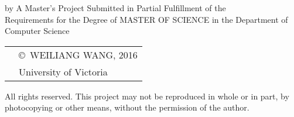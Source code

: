 \pagebreak
{
\centering
\thesistitle
\tpbreak
by
\tpbreak
\nameanddegrees
\tpbreak
A Master's Project Submitted in Partial Fulfillment of the \\
Requirements for the Degree of
\tpbreak
MASTER OF SCIENCE
\tpbreak
in the Department of Computer Science\\
\vfill
\begin{tabular}{cl}
& \copyright\ WEILIANG WANG, 2016\\
& \phantom{\copyright} University of Victoria
\end{tabular}
\tpbreak
All rights reserved. This project may not be reproduced in whole or in part, by \\
\hfill photocopying or other means, without the permission of the author. 
\hfill
}
\pagebreak
